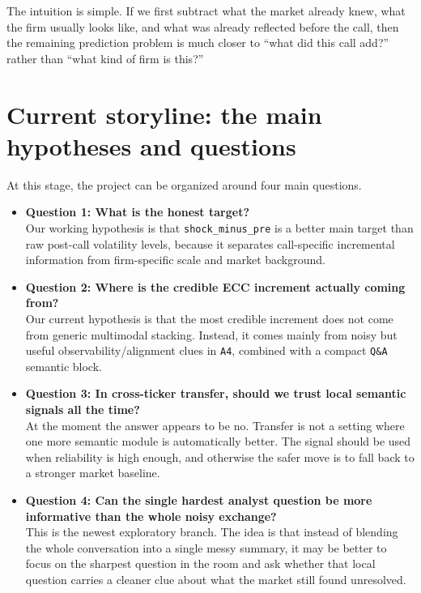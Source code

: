 \documentclass[11pt]{article}
\begin{document}
The intuition is simple. If we first subtract what the market already knew, what the firm usually looks like, and what was already reflected before the call, then the remaining prediction problem is much closer to ``what did this call add?'' rather than ``what kind of firm is this?''

\section{Current storyline: the main hypotheses and questions}
At this stage, the project can be organized around four main questions.

\begin{itemize}
    \item \textbf{Question 1: What is the honest target?}\\
    Our working hypothesis is that \texttt{shock\_minus\_pre} is a better main target than raw post-call volatility levels, because it separates call-specific incremental information from firm-specific scale and market background.

    \item \textbf{Question 2: Where is the credible ECC increment actually coming from?}\\
    Our current hypothesis is that the most credible increment does not come from generic multimodal stacking. Instead, it comes mainly from noisy but useful observability/alignment clues in \texttt{A4}, combined with a compact \texttt{Q\&A} semantic block.

    \item \textbf{Question 3: In cross-ticker transfer, should we trust local semantic signals all the time?}\\
    At the moment the answer appears to be no. Transfer is not a setting where one more semantic module is automatically better. The signal should be used when reliability is high enough, and otherwise the safer move is to fall back to a stronger market baseline.

    \item \textbf{Question 4: Can the single hardest analyst question be more informative than the whole noisy exchange?}\\
    This is the newest exploratory branch. The idea is that instead of blending the whole conversation into a single messy summary, it may be better to focus on the sharpest question in the room and ask whether that local question carries a cleaner clue about what the market still found unresolved.
\end{itemize}
\end{document}
